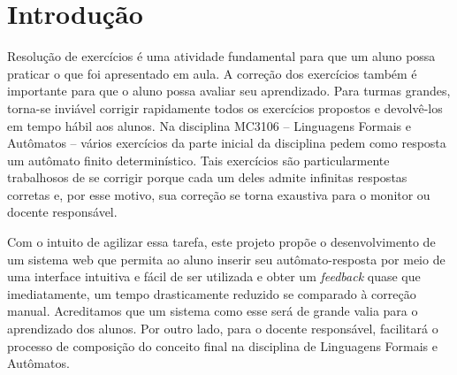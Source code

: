 \documentclass[
	12pt,				%
	openany,
	oneside,
	a4paper,			%
	english,			%
	brazil				%
	]{abntex2}
\begin{document}

{} %
\tableofcontents*
\cleardoublepage



\textual

\chapter[Introdução]{Introdução}

  Resolução de exercícios é uma atividade fundamental para que um aluno possa praticar o que foi apresentado em aula. A correção dos exercícios também é importante para que o aluno possa avaliar seu aprendizado. Para turmas grandes, torna-se inviável corrigir rapidamente todos os exercícios propostos e devolvê-los em tempo hábil aos alunos. Na disciplina MC3106 – Linguagens Formais e Autômatos – vários exercícios da parte inicial da disciplina pedem como resposta um autômato finito determinístico. Tais exercícios são particularmente trabalhosos de se corrigir porque cada um deles admite infinitas respostas corretas e, por esse motivo, sua correção se torna exaustiva para o monitor ou docente responsável.

  Com o intuito de agilizar essa tarefa, este projeto propõe o desenvolvimento de um sistema web que permita ao aluno inserir seu autômato-resposta por meio de uma interface intuitiva e fácil de ser utilizada e obter um \emph{feedback} quase que imediatamente, um tempo drasticamente reduzido se comparado à correção manual. Acreditamos que um sistema como esse será de grande valia para o aprendizado dos alunos. Por outro lado, para o docente responsável, facilitará o processo de composição do conceito final na disciplina de Linguagens Formais e Autômatos.
\end{document}
